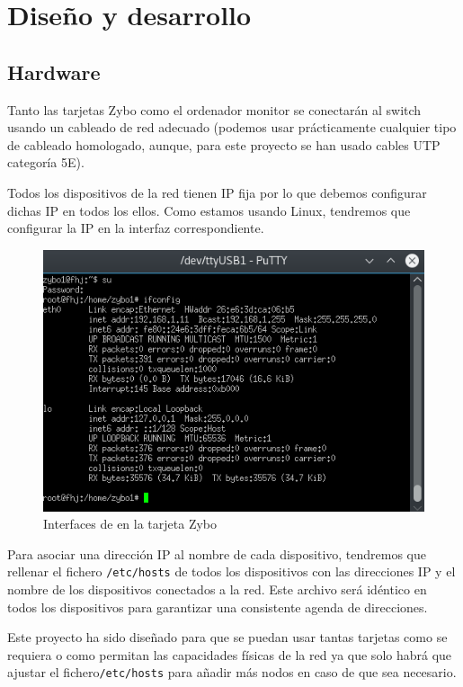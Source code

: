 \section{Diseño y desarrollo}
\subsection{Hardware}
Tanto las tarjetas Zybo como el ordenador monitor se conectarán al switch usando un cableado de red adecuado (podemos usar prácticamente cualquier tipo de cableado homologado, aunque, para este proyecto se han usado cables UTP categoría 5E).

Todos los dispositivos de la red tienen IP fija por lo que debemos configurar dichas IP en todos los ellos. Como estamos usando Linux, tendremos que configurar la IP en la interfaz correspondiente.
\begin{figure}[h]
	\centering
	\includegraphics[scale=0.8]{Anexos/Anexo2/Infraestructura/ifconfigZybo.png}
	\caption{Interfaces de en la tarjeta Zybo}
	\label{Interfaces de en la tarjeta Zybo}
\end{figure}

Para asociar una dirección IP al nombre de cada dispositivo, tendremos que rellenar el fichero \texttt{/etc/hosts} de todos los dispositivos con las direcciones IP y el nombre de los dispositivos conectados a la red. Este archivo será idéntico en todos los dispositivos para garantizar una consistente agenda de direcciones.

Este proyecto ha sido diseñado para que se puedan usar tantas tarjetas como se requiera o como permitan las capacidades físicas de la red ya que solo habrá que ajustar el fichero\texttt{/etc/hosts} para añadir más nodos en caso de que sea necesario.

